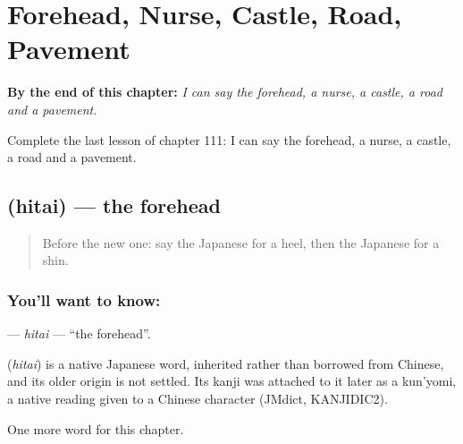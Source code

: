 
\chapter{Forehead, Nurse, Castle, Road, Pavement}
\label{ch:ja-forehead-nurse-castle-road-pavement}

\begin{chapteropening}
\textbf{By the end of this chapter:} \emph{I can say the forehead, a nurse, a castle, a road and a pavement.}

Complete the last lesson of chapter 111: I can say the forehead, a nurse, a castle, a road and a pavement.
\end{chapteropening}

\section[\texorpdfstring{\ja{ひたい} (hitai)}{ひたい (hitai)}]{ (hitai) — the forehead}

\label{lesson:JA-C111-hitai}



\begin{quote}
Before the new one: say the Japanese for a heel, then the Japanese for a shin.
\end{quote}

\subsection*{You'll want to know: }
\textbf{} — \emph{hitai} — \textquotedblleft{}the forehead\textquotedblright{}.

\begin{cousinweb}
\textbf{} (\emph{hitai}) is a native Japanese word, inherited rather than borrowed from Chinese, and its older origin is not settled. Its kanji was attached to it later as a kun'yomi, a native reading given to a Chinese character (JMdict, KANJIDIC2).
\end{cousinweb}

\begin{grammarlens}[title={What you've built}]
One more word for this chapter.
\end{grammarlens}


